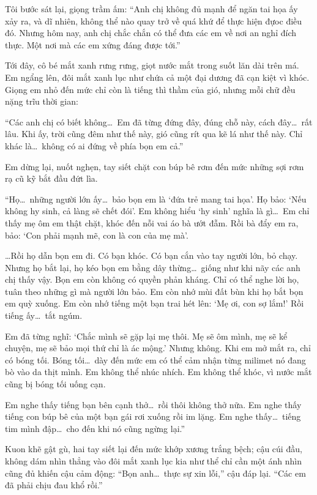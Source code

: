 \documentclass[../main.tex]{subfiles}
\begin{document}
Tôi bước sát lại, giọng trầm ấm: ``Anh chị không đủ mạnh để ngăn tai họa ấy xảy ra, và dĩ nhiên, không thể nào quay trở về quá khứ để thực hiện đựoc điều đó. Nhưng hôm nay, anh chị chắc chắn có thể đưa các em về nơi an nghỉ đích thực. Một nơi mà các em xứng đáng được tới.''

Tới đây, cô bé mắt xanh rưng rưng, giọt nước mắt trong suốt lăn dài trên má. Em ngẩng lên, đôi mắt xanh lục như chứa cả một đại dương đã cạn kiệt vì khóc.  Giọng em nhỏ đến mức chỉ còn là tiếng thì thầm của gió, nhưng mỗi chữ đều nặng trĩu thời gian:

``Các anh chị có biết không\dots\
Em đã từng đứng đây, đúng chỗ này, cách đây\dots\ rất lâu.
Khi ấy, trời cũng đêm như thế này, gió cũng rít qua kẽ lá như thế này.
Chỉ khác là\dots\ không có ai đứng về phía bọn em cả.''

Em dừng lại, nuốt nghẹn, tay siết chặt con búp bê rơm đến mức những sợi rơm rạ cũ kỹ bắt đầu đứt lìa.

``Họ\dots\ những người lớn ấy\dots\ bảo bọn em là `đứa trẻ mang tai họa'.
Họ bảo: `Nếu không hy sinh, cả làng sẽ chết đói'.
Em không hiểu `hy sinh' nghĩa là gì\dots\
Em chỉ thấy mẹ ôm em thật chặt, khóc đến nỗi vai áo bà ướt đẫm.
Rồi bà đẩy em ra, bảo: `Con phải mạnh mẽ, con là con của mẹ mà'.

\dots Rồi họ dẫn bọn em đi.
Có bạn khóc. Có bạn cắn vào tay người lớn, bỏ chạy.
Nhưng họ bắt lại, họ kéo bọn em bằng dây thừng\dots\ giống như khi nãy các anh chị thấy vậy.
Bọn em còn không có quyền phản kháng. Chỉ có thể nghe lời họ, tuân theo những gì mà người lớn bảo.
Em còn nhớ mùi đất bùn khi họ bắt bọn em quỳ xuống.
Em còn nhớ tiếng một bạn trai hét lên: `Mẹ ơi, con sợ lắm!'
Rồi tiếng ấy\dots\ tắt ngúm.

Em đã từng nghĩ: `Chắc mình sẽ gặp lại mẹ thôi.
Mẹ sẽ ôm mình, mẹ sẽ kể chuyện, mẹ sẽ bảo mọi thứ chỉ là ác mộng.'
Nhưng không.
Khi em mở mắt ra, chỉ có bóng tối.
Bóng tối\dots\ dày đến mức em có thể cảm nhận từng milimet nó đang bò vào da thịt mình.
Em không thể nhúc nhích.
Em không thể khóc, vì nước mắt cũng bị bóng tối uống cạn.

Em nghe thấy tiếng bạn bên cạnh thở\dots\ rồi thôi không thở nữa.
Em nghe thấy tiếng con búp bê của một bạn gái rơi xuống rồi im lặng.
Em nghe thấy\dots\ tiếng tim mình đập\dots\ cho đến khi nó cũng ngừng lại.''

Kuon khẽ gật gù, hai tay siết lại đến mức khớp xương trắng bệch; cậu cúi đầu, không dám nhìn thẳng vào đôi mắt xanh lục kia như thể chỉ cần một ánh nhìn cũng đủ khiến cậu cảm động: ``Bọn anh\dots\ thực sự xin lỗi,'' cậu đáp lại. ``Các em đã phải chịu đau khổ rồi.''
\end{document}
